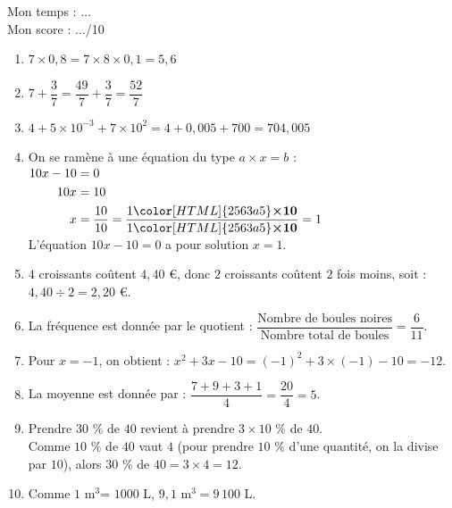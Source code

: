 \documentclass[a4paper,11pt,exos]{nsi} %
\begin{document}
\vspace*{1cm}
Mon temps : $\ldots$\\[.5em]
Mon score : $\ldots$/10

\newpage
{}
\maketitle

\textcolor{UGLiBlue}{
\begin{enumerate}[itemsep=1em]
    \item $7 \times 0{,}8=7\times 8\times 0,1=5{,}6$
    \item $7+\dfrac{3}{7}= \dfrac{49}{7}+\dfrac{3}{7}=\dfrac{52}{7}$
    \item $4+5\times 10^{-3}+7\times10^2=4+0{,}005+700=704{,}005$
    \item On se ramène à une équation du type $a\times x=b$ :\\
              $\begin{aligned}
              10x-10&=0\\
             10x&=10\\
                                  x&=\dfrac{10}{10}=\dfrac{1{\color[HTML]{2563a5}\boldsymbol{\times10}} }{1{\color[HTML]{2563a5}\boldsymbol{\times10}}}=1
             \end{aligned}$\\
              L'équation $10x-10=0$ a pour solution $x=1$.
    \item $4$ croissants coûtent  $4{,}40$ €, donc
                           $2$ croissants coûtent $2$ fois moins, soit : \\
                           $4{,}40\div 2=2{,}20$ €.
    \item La fréquence est donnée par le quotient : $\dfrac{\text{Nombre de boules noires}}{\text{Nombre total de boules}}=\dfrac{6}{11}$.
    \item 
                Pour $x=-1$, on obtient : $x^2+3x-10=(-1)^2+3\times (-1)-10=-12$.
    \item La moyenne est donnée par : $\dfrac{7+9+3+1}{4}=\dfrac{20}{4}=5$.
    \item           Prendre $30$ $\%$  de $40$ revient à prendre $3\times 10$ $\%$  de $40$.\\
                Comme $10$ $\%$  de $40$ vaut $4$ (pour prendre $10$ $\%$  d'une quantité, on la divise par $10$), alors
                $30$ $\%$ de $40=3\times 4=12$.
    \item Comme $1$ m$^3$= $1000$ L, $9{,}1$ m$^3=9\,100$ L.
\end{enumerate}}
\end{document}
